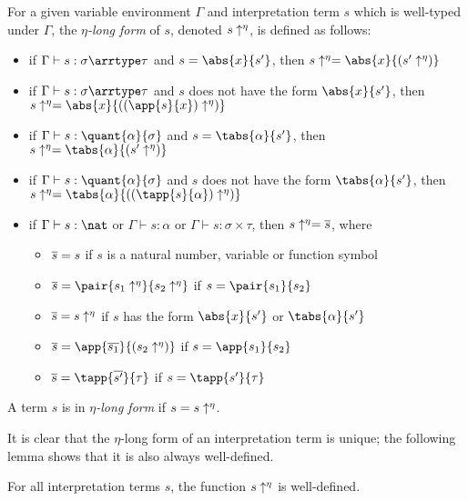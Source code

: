 \begin{definition}
For a given variable environment $\Gamma$ and interpretation term $s$
which is well-typed under $\Gamma$, the \emph{$\eta$-long form} of $s$,
denoted $s\uparrow^\eta$, is defined as follows:
\begin{itemize}
\item if $\Gamma \vdash s : \sigma \arrtype \tau$ and $s = \abs{x}{s'}$,
  then $\etalong{s} =  \abs{x}{(\etalong{s'})}$
\item if $\Gamma \vdash s : \sigma \arrtype \tau$ and $s$ does not have
  the form $\abs{x}{s'}$, then $\etalong{s} =  \abs{x}{(
  \etalong{(\app{s}{x})})}$
\item if $\Gamma \vdash s : \quant{\alpha}{\sigma}$ and $s = \tabs{
  \alpha}{s'}$, then $\etalong{s} = \tabs{\alpha}{(\etalong{s'})}$
\item if $\Gamma \vdash s : \quant{\alpha}{\sigma}$ and $s$ does not have
  the form $\tabs{\alpha}{s'}$, then $\etalong{s} = \tabs{\alpha}{
  (\etalong{(\tapp{s}{\alpha})})}$
\item if $\Gamma \vdash s : \nat$ or $\Gamma \vdash s : \alpha$ or
  $\Gamma \vdash s : \sigma \times \tau$, then $s\uparrow^\eta =
  \overline{s}$, where
  \begin{itemize}
  \item $\overline{s} = s$ if $s$ is a natural number, variable or
    function symbol
  \item $\almostetalong{s} = \pair{\etalong{s_1}}{\etalong{s_2}}$ if
    $s = \pair{s_1}{s_2}$
  \item $\overline{s} = s\uparrow^\eta$ if $s$ has the form
    $\abs{x}{s'}$ or $\tabs{\alpha}{s'}$
  \item $\almostetalong{s} = \app{\almostetalong{s_1}}{(\etalong{s_2})}$
    if $s = \app{s_1}{s_2}$
  \item $\almostetalong{s} = \tapp{\almostetalong{s'}}{\tau}$
    if $s = \tapp{s'}{\tau}$
  \end{itemize}
\end{itemize}
A term $s$ is in \emph{$\eta$-long form} if $s = s\uparrow^\eta$.
\end{definition}

It is clear that the $\eta$-long form of an interpretation term is
unique; the following lemma shows that it is also always well-defined.

\begin{lemma}
For all interpretation terms $s$, the function $s\uparrow^\eta$ is
well-defined.
\end{lemma}

